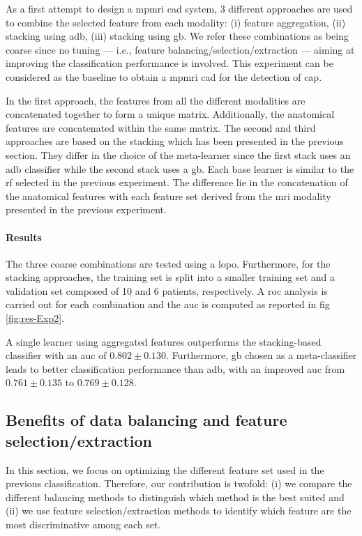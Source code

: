 As a first attempt to design a \ac{mpmri} \ac{cad} system, 3 different approaches are used to combine the selected feature from each modality:
(i) feature aggregation,
(ii) stacking using \ac{adb},
(iii) stacking using \ac{gb}.
We refer these combinations as being coarse since no tuning --- i.e., feature balancing/selection/extraction --- aiming at improving the classification performance is involved.
This experiment can be considered as the baseline to obtain a \ac{mpmri} \ac{cad} for the detection of \ac{cap}.

In the first approach, the features from all the different modalities are concatenated together to form a unique matrix.
Additionally, the anatomical features are concatenated within the same matrix.
The second and third approaches are based on the stacking which has been presented in the previous section.
They differ in the choice of the meta-learner since the first stack uses an \ac{adb} classifier while the second stack uses a \ac{gb}.
Each base learner is similar to the \ac{rf} selected in the previous experiment.
The difference lie in the concatenation of the anatomical features with each feature set derived from the \ac{mri} modality presented in the previous experiment.

\paragraph{Results}
The three coarse combinations are tested using a \ac{lopo}.
Furthermore, for the stacking approaches, the training set is split into a smaller training set and a validation set composed of 10 and 6 patients, respectively.
A \ac{roc} analysis is carried out for each combination and the \ac{auc} is computed as reported in \acs{fig}\,\ref{fig:res-Exp2}.

A single learner using aggregated features outperforms the stacking-based classifier with an \ac{auc} of $0.802 \pm 0.130$.
Furthermore, \ac{gb} chosen as a meta-classifier leads to better classification performance than \ac{adb}, with an improved \ac{auc} from $0.761 \pm 0.135$ to $0.769 \pm 0.128$.

\subsection{Benefits of data balancing and feature selection/extraction}\label{subsec:chp6:exp-res:Ex3}

In this section, we focus on optimizing the different feature set used in the previous classification.
Therefore, our contribution is twofold: (i) we compare the different balancing methods to distinguish which method is the best suited and (ii) we use feature selection/extraction methods to identify which feature are the most discriminative among each set.

